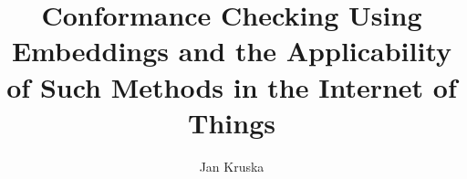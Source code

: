 \documentclass[runningheads]{template/llncs}
\begin{document}
%
\title{Conformance Checking Using Embeddings and the Applicability of Such Methods in the Internet of Things}
%
%
\author{Jan Kruska}
%
%
%
\maketitle              %
%
%
%
%
\end{document}
